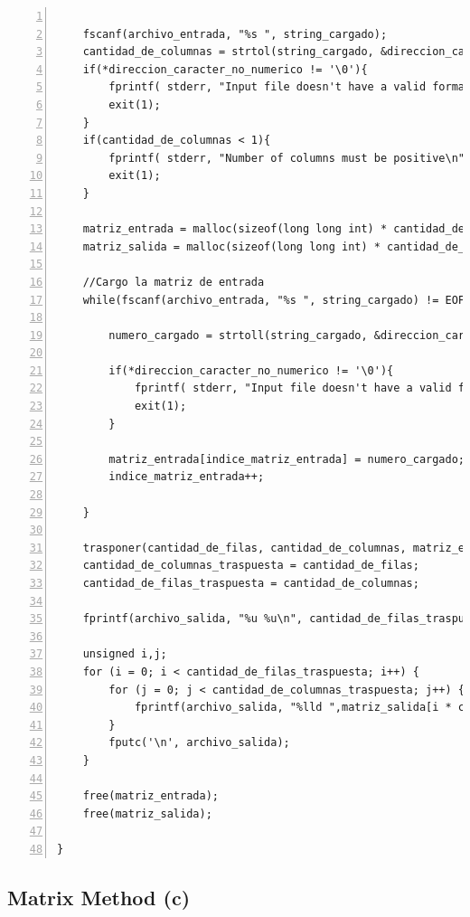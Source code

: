 \documentclass[11pt,a4paper]{article}
\begin{document}
\begin{lstlisting}[numbers=left, tabsize=2, basicstyle=\fontsize{11}{13}\ttfamily, frame=single, caption={makefile}]
        
    fscanf(archivo_entrada, "%s ", string_cargado);
    cantidad_de_columnas = strtol(string_cargado, &direccion_caracter_no_numerico, 0);
    if(*direccion_caracter_no_numerico != '\0'){
        fprintf( stderr, "Input file doesn't have a valid format\n"); 
        exit(1);
    }
    if(cantidad_de_columnas < 1){
        fprintf( stderr, "Number of columns must be positive\n"); 
        exit(1);
    }
    
    matriz_entrada = malloc(sizeof(long long int) * cantidad_de_filas * cantidad_de_columnas);
    matriz_salida = malloc(sizeof(long long int) * cantidad_de_filas * cantidad_de_columnas);
    
    //Cargo la matriz de entrada
    while(fscanf(archivo_entrada, "%s ", string_cargado) != EOF){
        
        numero_cargado = strtoll(string_cargado, &direccion_caracter_no_numerico, 0); //Esta en base 10;
        
        if(*direccion_caracter_no_numerico != '\0'){
            fprintf( stderr, "Input file doesn't have a valid format\n"); 
            exit(1);
        }
        
        matriz_entrada[indice_matriz_entrada] = numero_cargado;
        indice_matriz_entrada++;
        
    }
    
    trasponer(cantidad_de_filas, cantidad_de_columnas, matriz_entrada, matriz_salida);
    cantidad_de_columnas_traspuesta = cantidad_de_filas;
    cantidad_de_filas_traspuesta = cantidad_de_columnas;
    
    fprintf(archivo_salida, "%u %u\n", cantidad_de_filas_traspuesta, cantidad_de_columnas_traspuesta );
    
    unsigned i,j;
    for (i = 0; i < cantidad_de_filas_traspuesta; i++) {
        for (j = 0; j < cantidad_de_columnas_traspuesta; j++) {
            fprintf(archivo_salida, "%lld ",matriz_salida[i * cantidad_de_columnas_traspuesta + j]);
        } 
        fputc('\n', archivo_salida);
    }
    
    free(matriz_entrada);
    free(matriz_salida);
    
}

\end{lstlisting}


\subsection{Matrix Method (c)}
\end{document}
